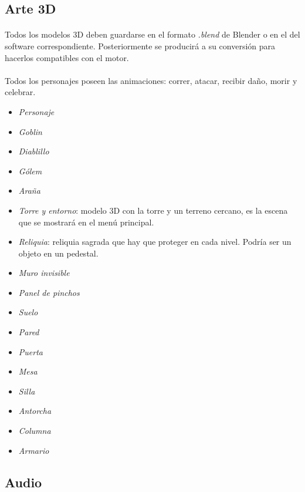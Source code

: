 \subsection{Arte 3D}

\paragraph{}
Todos los modelos 3D deben guardarse en el formato \emph{.blend} de Blender
o en el del software correspondiente. Posteriormente se producirá a su conversión
para hacerlos compatibles con el motor.

\paragraph{}
Todos los personajes poseen las animaciones: correr, atacar, recibir daño,
morir y celebrar.

\begin{itemize}
    \item \emph{Personaje}
    \item \emph{Goblin}
    \item \emph{Diablillo}
    \item \emph{Gólem}
    \item \emph{Araña}
    \item \emph{Torre y entorno}: modelo 3D con la torre y un terreno cercano,
    es la escena que se mostrará en el menú principal.
    \item \emph{Reliquia}: reliquia sagrada que hay que proteger en cada nivel.
    Podría ser un objeto en un pedestal.
    \item \emph{Muro invisible} 
    \item \emph{Panel de pinchos}
    \item \emph{Suelo}
    \item \emph{Pared}
    \item \emph{Puerta}
    \item \emph{Mesa}
    \item \emph{Silla}
    \item \emph{Antorcha}
    \item \emph{Columna}
    \item \emph{Armario}
\end{itemize}

\subsection{Audio}

